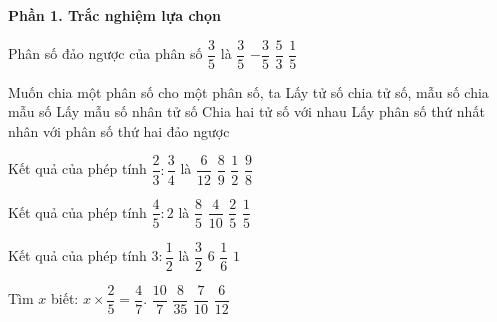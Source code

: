 \textbf{Phần 1. Trắc nghiệm lựa chọn}

\begin{ex} %
Phân số đảo ngược của phân số $\dfrac{3}{5}$ là
\choice
{$\dfrac{3}{5}$}
{$-\dfrac{3}{5}$}
{\True $\dfrac{5}{3}$}
{$\dfrac{1}{5}$}
\end{ex}

\begin{ex} %
Muốn chia một phân số cho một phân số, ta
\choice
{Lấy tử số chia tử số, mẫu số chia mẫu số}
{Lấy mẫu số nhân tử số}
{Chia hai tử số với nhau}
{\True Lấy phân số thứ nhất nhân với phân số thứ hai đảo ngược}
\end{ex}

\begin{ex} %
Kết quả của phép tính $\dfrac{2}{3} : \dfrac{3}{4}$ là
\choice
{$\dfrac{6}{12}$}
{\True $\dfrac{8}{9}$}
{$\dfrac{1}{2}$}
{$\dfrac{9}{8}$}
\end{ex}

\begin{ex} %
Kết quả của phép tính $\dfrac{4}{5} : 2$ là
\choice
{$\dfrac{8}{5}$}
{$\dfrac{4}{10}$}
{\True $\dfrac{2}{5}$}
{$\dfrac{1}{5}$}
\end{ex}

\begin{ex} %
Kết quả của phép tính $3 : \dfrac{1}{2}$ là
\choice
{$\dfrac{3}{2}$}
{\True $6$}
{$\dfrac{1}{6}$}
{$1$}
\end{ex}

\begin{ex} %
Tìm $x$ biết: $x \times \dfrac{2}{5} = \dfrac{4}{7}$.
\choice
{\True $\dfrac{10}{7}$}
{$\dfrac{8}{35}$}
{$\dfrac{7}{10}$}
{$\dfrac{6}{12}$}
\end{ex}

